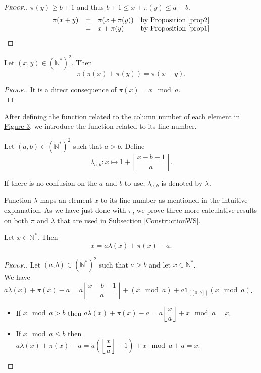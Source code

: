 \begin{proof}[\textsc{Proof.}]
\(\pi(y) \geqslant b + 1\) and thus \(b + 1 \leqslant x + \pi(y) \leqslant a + b\).
\[
\begin{array}{l l l l}
	\pi(x + y) & = & \pi(x + \pi(y)) & \text{by Proposition \ref{prop2}} \\
	 & = & x + \pi(y) & \text{by Proposition \ref{prop1}}
\end{array}
\]
\end{proof}

\begin{proposition}
\label{prop4}
Let \((x,y)\in (\mathbb{N}^*)^2\). Then
\[
\pi(\pi(x)+\pi(y))=\pi(x+y).
\]
\end{proposition}

\begin{proof}[\textsc{Proof.}]
It is a direct consequence of \(\pi(x) = x \mod a\). \\
\end{proof}

After defining the function related to the column number of each element in \hyperref[SchemaWS]{Figure 3},
we introduce the function related to its line number.

\begin{definition}
Let \((a,b) \in (\mathbb{N}^*)^2\) such that \(a>b\). Define
\[ \lambda_{a,b}:x \longmapsto 1+ \left\lfloor\dfrac{x-b-1}{a}\right\rfloor.\]
\end{definition}

If there is no confusion on the \(a\) and \(b\) to use, \(\lambda_{a, b}\) is denoted by \(\lambda\).

Function \(\lambda\) maps an element \(x\) to its line number as mentioned in the intuitive explanation.
As we have just done with \(\pi\), we prove three more calculative results on both \(\pi\) and \(\lambda\) that are used in
Subsection \ref{ConstructionWS}.

\begin{proposition}
\label{prop5}
Let \(x\in \mathbb{N}^*\). Then
\[
x=a\lambda(x)+\pi(x)-a.
\]
\end{proposition}

\begin{proof}[\textsc{Proof.}]
Let \((a,b)\in (\mathbb{N}^*)^2\) such that \(a>b\) and let \(x\in \mathbb{N}^*\). \\
We have \(a\lambda(x)+\pi(x)-a=a\left\lfloor\dfrac{x-b-1}{a}\right\rfloor+(x \mod a)+ a \mathds{1}_{ [\![0,b]\!]}(x \mod a)\).

\begin{itemize}
\item If \(x \mod a>b\) then \(a\lambda(x)+\pi(x)-a=a\left\lfloor\dfrac{x}{a}\right\rfloor+x \mod a=x\).
\item If \(x \mod a \leqslant b\) then \(a\lambda(x)+\pi(x)-a=a \left( \left \lfloor \dfrac{x}{a} \right \rfloor - 1 \right)+x \mod a +a=x\).
\end{itemize}
\end{proof}


